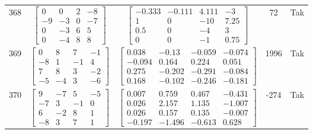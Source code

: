 \documentclass[a4paper,12pt]{article}
\begin{document}
\begin{tabular}{c c c c c}
368
&
$\begin{bmatrix} 0 & 0 & 2 & -8 \\ -9 & -3 & 0 & -7 \\ 0 & -3 & 6 & 5 \\ 0 & -4 & 8 & 8 \end{bmatrix}$
&
$\begin{bmatrix} -0.333 & -0.111 & 4.111 & -3 \\ 1 & 0 & -10 & 7.25 \\ 0.5 & 0 & -4 & 3 \\ 0 & 0 & -1 & 0.75 \end{bmatrix}$
&
72
&
Tak
\\
369
&
$\begin{bmatrix} 0 & 8 & 7 & -1 \\ -8 & 1 & -1 & 4 \\ 7 & 8 & 3 & -2 \\ -5 & -4 & 3 & -6 \end{bmatrix}$
&
$\begin{bmatrix} 0.038 & -0.13 & -0.059 & -0.074 \\ -0.094 & 0.164 & 0.224 & 0.051 \\ 0.275 & -0.202 & -0.291 & -0.084 \\ 0.168 & -0.102 & -0.246 & -0.181 \end{bmatrix}$
&
1996
&
Tak
\\
370
&
$\begin{bmatrix} 9 & -7 & 5 & -5 \\ -7 & 3 & -1 & 0 \\ 6 & -2 & 8 & 1 \\ -8 & 3 & 7 & 1 \end{bmatrix}$
&
$\begin{bmatrix} 0.007 & 0.759 & 0.467 & -0.431 \\ 0.026 & 2.157 & 1.135 & -1.007 \\ 0.026 & 0.157 & 0.135 & -0.007 \\ -0.197 & -1.496 & -0.613 & 0.628 \end{bmatrix}$
&
-274
&
Tak
\\
\end{tabular} \egroup \newpage
\end{document}
